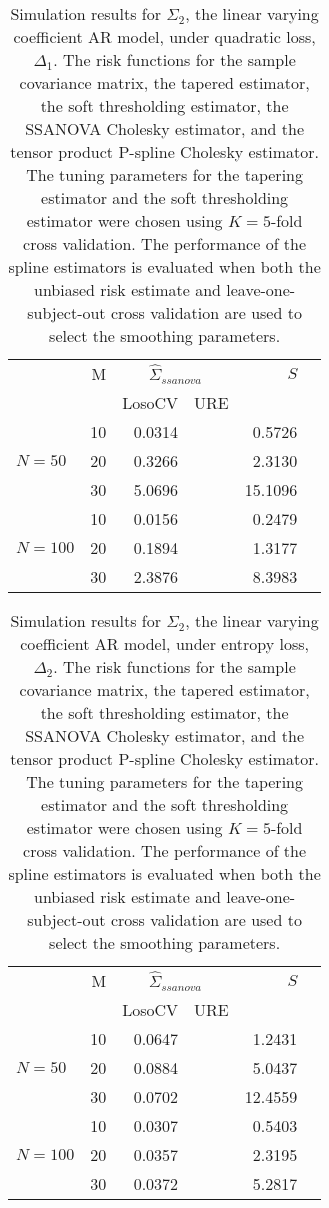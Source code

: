 \documentclass[12pt]{article}
\theoremstyle{definition}
\begin{document}

\begin{table}[ht]
\centering
\caption{Simulation results for $\Sigma_2$, the  linear varying coefficient AR model, under quadratic loss, $\Delta_1$. The risk functions for the sample covariance matrix, the tapered estimator, the soft thresholding estimator, the SSANOVA Cholesky estimator, and the tensor product P-spline Cholesky estimator. The tuning parameters for the tapering estimator and the soft thresholding estimator were chosen using $K = 5$-fold cross validation. The performance of the spline estimators is evaluated when both the unbiased risk estimate and leave-one-subject-out cross validation are used to select the smoothing parameters.}
\begin{tabular}{lrrrrr}
& M & \multicolumn{2}{c}{$\hat{\Sigma}_{ssanova}$} & $S$ \\ 
& & \mbox{LosoCV} & \mbox{URE} &  \\   \hline
&    10 & 0.0314 & &0.5726 \\ 
$N = 50 $ &    20 & 0.3266 && 2.3130 \\ 
 &    30 & 5.0696 & &15.1096 \\ \hdashline
 &    10 & 0.0156 && 0.2479 \\ 
$N = 100$ &    20 & 0.1894 & &1.3177 \\ 
  &    30 & 2.3876 && 8.3983 \\ 
   \hline
\end{tabular}
\end{table}

\begin{table}[ht]
\centering
\caption{Simulation results for $\Sigma_2$, the linear varying coefficient AR model, under entropy loss, $\Delta_2$. The risk functions for the sample covariance matrix, the tapered estimator, the soft thresholding estimator, the SSANOVA Cholesky estimator, and the tensor product P-spline Cholesky estimator. The tuning parameters for the tapering estimator and the soft thresholding estimator were chosen using $K = 5$-fold cross validation. The performance of the spline estimators is evaluated when both the unbiased risk estimate and leave-one-subject-out cross validation are used to select the smoothing parameters.}
\begin{tabular}{lrrrrr}
& M & \multicolumn{2}{c}{$\hat{\Sigma}_{ssanova}$} & $S$ \\ 
& & \mbox{LosoCV} & \mbox{URE} &  \\   \hline
  \hline
 &    10 & 0.0647 & & 1.2431 \\ 
$N = 50$ &    20 & 0.0884 & & 5.0437 \\ 
&    30 & 0.0702 & & 12.4559 \\ 
   \hdashline
&    10 & 0.0307 & & 0.5403 \\ 
$N = 100 $ &    20 & 0.0357 & & 2.3195 \\ 
   &    30 & 0.0372 & & 5.2817 \\ 
\end{tabular}
\end{table}
\end{document}
